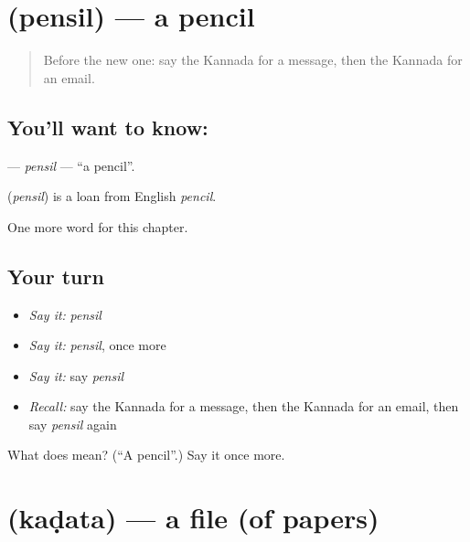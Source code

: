 \section[\texorpdfstring{\kn{ಪೆನ್ಸಿಲ್} (pensil)}{ಪೆನ್ಸಿಲ್ (pensil)}]{ (pensil) — a pencil}

\label{lesson:KA-C186-pensil}



\begin{quote}
Before the new one: say the Kannada for a message, then the Kannada for an email.
\end{quote}

\subsection*{You'll want to know: }
\textbf{} — \emph{pensil} — \textquotedblleft{}a pencil\textquotedblright{}.

\begin{cousinweb}
\textbf{} (\emph{pensil}) is a loan from English \emph{pencil}.
\end{cousinweb}

\begin{grammarlens}[title={What you've built}]
One more word for this chapter.
\end{grammarlens}

\subsection*{Your turn}
\begin{itemize}
\raggedright
  \item \emph{Say it:} \emph{pensil}
  \item \emph{Say it:} \emph{pensil}, once more
  \item \emph{Say it:} say \emph{pensil}
  \item \emph{Recall:} say the Kannada for a message, then the Kannada for an email, then say \emph{pensil} again
\end{itemize}

\begin{tcolorbox}[breakable,colback=teal!4,colframe=teal!35!black,title={Before you move on}]
What does  mean? (\textquotedblleft{}A pencil\textquotedblright{}.) Say it once more.
\end{tcolorbox}
\section[\texorpdfstring{\kn{ಕಡತ} (kaḍata)}{ಕಡತ (kaḍata)}]{ (kaḍata) — a file (of papers)}

